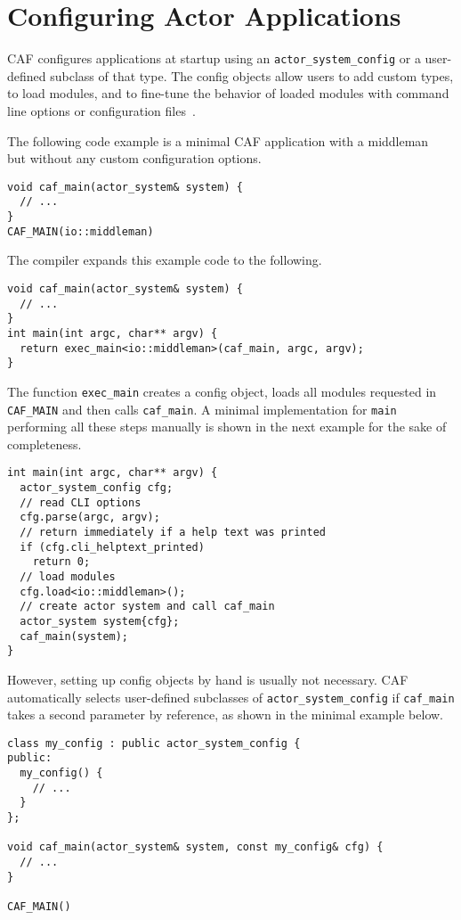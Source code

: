 \section{Configuring Actor Applications}
\label{system-config}

CAF configures applications at startup using an
\lstinline^actor_system_config^ or a user-defined subclass of that type. The
config objects allow users to add custom types, to load modules, and to
fine-tune the behavior of loaded modules with command line options or
configuration files~.

The following code example is a minimal CAF application with a
middleman~ but without any custom configuration options.

\begin{lstlisting}
void caf_main(actor_system& system) {
  // ...
}
CAF_MAIN(io::middleman)
\end{lstlisting}

The compiler expands this example code to the following.

\begin{lstlisting}
void caf_main(actor_system& system) {
  // ...
}
int main(int argc, char** argv) {
  return exec_main<io::middleman>(caf_main, argc, argv);
}
\end{lstlisting}

The function \lstinline^exec_main^ creates a config object, loads all modules
requested in \lstinline^CAF_MAIN^ and then calls \lstinline^caf_main^. A
minimal implementation for \lstinline^main^ performing all these steps manually
is shown in the next example for the sake of completeness.

\begin{lstlisting}
int main(int argc, char** argv) {
  actor_system_config cfg;
  // read CLI options
  cfg.parse(argc, argv);
  // return immediately if a help text was printed
  if (cfg.cli_helptext_printed)
    return 0;
  // load modules
  cfg.load<io::middleman>();
  // create actor system and call caf_main
  actor_system system{cfg};
  caf_main(system);
}
\end{lstlisting}

However, setting up config objects by hand is usually not necessary. CAF
automatically selects user-defined subclasses of
\lstinline^actor_system_config^ if \lstinline^caf_main^ takes a second
parameter by reference, as shown in the minimal example below.

\begin{lstlisting}
class my_config : public actor_system_config {
public:
  my_config() {
    // ...
  }
};

void caf_main(actor_system& system, const my_config& cfg) {
  // ...
}

CAF_MAIN()
\end{lstlisting}

